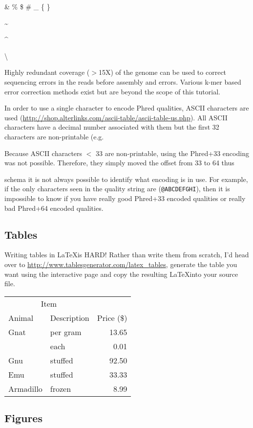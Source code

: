 \& \% \$ \# \_ \{ \}

\textasciitilde

\textasciicircum

\textbackslash

Highly redundant coverage ($>$15X) of the genome can be used to correct sequencing
errors in the reads before assembly and errors. Various k-mer based error
correction methods exist but are beyond the scope of this tutorial.

In order to use a single character to encode Phred qualities, ASCII characters
are used (\url{http://shop.alterlinks.com/ascii-table/ascii-table-us.php}). All ASCII characters have a decimal
number associated with them but the first 32 characters are non-printable (e.g.

Because ASCII characters $<$ 33 are non-printable, using the Phred+33 encoding was
not possible. Therefore, they simply moved the offset from 33 to 64 thus

schema it is not always possible to identify what encoding is in use. For
example, if the only characters seen in the quality string are (\texttt{@ABCDEFGHI}),
then it is impossible to know if you have really good Phred+33 encoded qualities
or really bad Phred+64 encoded qualities.

\subsection{Tables}

Writing tables in \LaTeX is HARD! Rather than write them from scratch, I'd head over to
\url{http://www.tablesgenerator.com/latex_tables}, generate the table you want using the interactive
page and copy the resulting \LaTeX into your source file.

\begin{tabular}{llr}
\hline
\multicolumn{2}{c}{Item} \\
\cline{1-2}
Animal    & Description & Price (\$) \\
\hline
Gnat      & per gram    & 13.65      \\
          & each        & 0.01       \\
Gnu       & stuffed     & 92.50      \\
Emu       & stuffed     & 33.33      \\
Armadillo & frozen      & 8.99       \\
\hline
\end{tabular}

\subsection{Figures}

